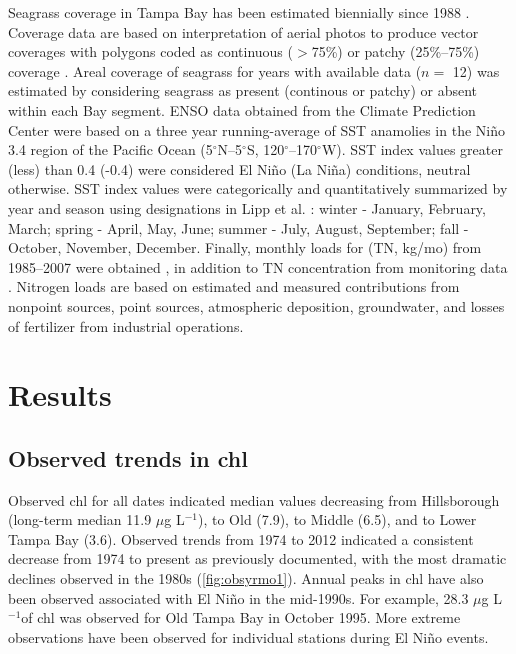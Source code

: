 \documentclass{svjour3}\usepackage[]{graphicx}\usepackage[]{color}
\newcommand{\mugl}{$\mu$g L$^{-1}$}
\begin{document}
Seagrass coverage in Tampa Bay has been estimated biennially since 1988 \cite{Tomasko05}.  Coverage data are based on interpretation of aerial photos to produce vector coverages with polygons coded as continuous ($>$75\%) or patchy (25\%--75\%) coverage \cite{SFWMD13}.  Areal coverage of seagrass for years with available data ($n=$ 12) was estimated by considering seagrass as present (continous or patchy) or absent within each Bay segment.  \ac{ENSO} data obtained from the Climate Prediction Center \cite{CPC13} were based on a three year running-average of \ac{SST} anamolies in the Ni\~{n}o 3.4 region of the Pacific Ocean (5$^{\circ}$N--5$^{\circ}$S, 120$^{\circ}$--170$^{\circ}$W).  \ac{SST} index values greater (less) than 0.4 (-0.4) were considered El Ni\~{n}o (La Ni\~{n}a) conditions, neutral otherwise.  \ac{SST} index values were categorically and quantitatively summarized by year and season using designations in Lipp et al. \cite{Lipp01}: winter - January, February, March; spring - April, May, June; summer - July, August, September; fall - October, November, December.  Finally, monthly loads for  (\acs{TN}, kg/mo) from 1985--2007 were obtained \cite{Zarbock94,Pribble01,Poe05}, in addition to \ac{TN} concentration from monitoring data \cite{TBEP11}.  Nitrogen loads are based on estimated and measured contributions from nonpoint sources, point sources, atmospheric deposition, groundwater, and losses of fertilizer from industrial operations.

\section{Results}

\subsection{Observed trends in \acl{chl}}

Observed \ac{chl} for all dates indicated median values decreasing from Hillsborough (long-term median 11.9 \mugl), to Old (7.9), to Middle (6.5), and to Lower Tampa Bay (3.6).  Observed trends from 1974 to 2012 indicated a consistent decrease from 1974 to present as previously documented, with the most dramatic declines observed in the 1980s (\cref{fig:obsyrmo1}).  Annual peaks in \ac{chl} have also been observed associated with El Ni\~{n}o \cite{Greening06} in the mid-1990s.  For example, 28.3 \mugl of \ac{chl} was observed for Old Tampa Bay in October 1995.  More extreme observations have been observed for individual stations during El Ni\~{n}o events. 
\end{document}
